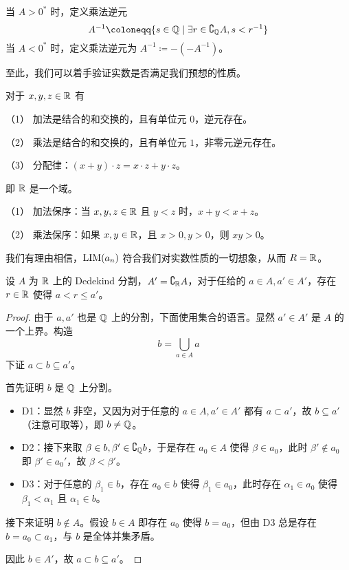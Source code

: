 当 $A > 0^*$ 时，定义乘法逆元
$$A^{-1} \coloneqq  \{s \in \QQ \mid \exists r \in \complement_\QQ A, s < r^{-1}\}$$
当 $A < 0^*$ 时，定义乘法逆元为 $A^{-1} \coloneqq  -(-A^{-1})$。

至此，我们可以着手验证实数是否满足我们预想的性质。

\begin{theorem}[$\RR$ 的代数算律]
	对于 $x,y,z\in \mathbb{R}$ 有

	（1） 加法是结合的和交换的，且有单位元 $0$，逆元存在。

	（2） 乘法是结合的和交换的，且有单位元 $1$，非零元逆元存在。

	（3） 分配律：$(x+y) \cdot  z = x \cdot z + y\cdot z$。
\end{theorem}

即 $\RR$ 是一个域。

\begin{theorem}[$\RR$ 是有序域]
	（1） 加法保序：当 $x,y,z\in \mathbb{R}$ 且 $y<z$ 时，$x+y<x+z$。

	（2） 乘法保序：如果 $x,y\in \mathbb{R}$，且 $x>0,y>0$，则 $xy>0$。
\end{theorem}

我们有理由相信，$\operatorname{{LIM}}(a_n)$ 符合我们对实数性质的一切想象，从而 $R = \mathbb{R}$。

\begin{theorem}[Dedekind 原理]
	设 $A$ 为 $\RR$ 上的 Dedekind 分割，$A' = \complement_{\mathbb{R}} A$，对于任给的 $a\in A,a' \in A'$，存在 $r \in \mathbb{R}$ 使得 $a < r \leqslant a'$。
\end{theorem}

\begin{proof}
	由于 $a, a'$ 也是 $\mathbb{Q}$ 上的分割，下面使用集合的语言。显然 $a' \in A'$ 是 $A$ 的一个上界。构造
	\[ b = \bigcup_{a \in A} a \]
	下证 $a \subset b \subseteq a'$。

	首先证明 $b$ 是 $\mathbb{Q}$ 上分割。

	\begin{itemize}
		\item D1：显然 $b$ 非空，又因为对于任意的 $a \in A, a' \in A'$ 都有 $a \subset a'$，故 $b \subseteq a'$（注意可取等），即 $b \neq \mathbb{Q}$。
		\item D2：接下来取 $\beta \in b, \beta' \in \complement_{\mathbb{Q}} b$，于是存在 $a_0 \in A$ 使得 $\beta \in a_0$，此时 $\beta' \notin a_0$ 即 $\beta' \in a_0'$，故 $\beta < \beta'$。
		\item D3：对于任意的 $\beta_1 \in b$，存在 $a_0 \in b$ 使得 $\beta_1 \in a_0$，此时存在 $\alpha_1 \in a_0$ 使得 $\beta_1 < \alpha_1$ 且 $\alpha_1 \in b$。
	\end{itemize}


	接下来证明 $b \notin A$。假设 $b \in A$ 即存在 $a_0$ 使得 $b = a_0$，但由 D3 总是存在 $b = a_0 \subset a_1$，与 $b$ 是全体并集矛盾。

	因此 $b \in A'$，故 $a \subset b \subseteq a'$。
\end{proof}

